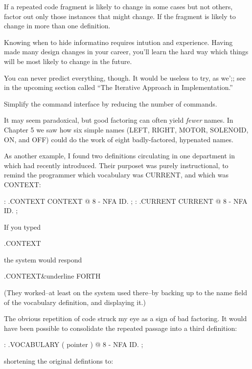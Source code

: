 \begin{tip}
If a repeated code fragment is likely to change in some cases but not others, factor out only those instances that might change. If the fragment is likely to change in more than one definition.
\end{tip}
Knowing when to hide informatino requires intution and experience. Having made many design changes in your career, you'll learn the hard way which things will be most likely to change in the future.

You can never predict everything, though. It would be useless to try, as we';; see in the upcoming section called ``The Iterative Approach in Implementation.''

\begin{tip}
Simplify the command interface by reducing the number of commands.
\end{tip}
It may seem paradoxical, but good factoring can often yield \emph{fewer} names. In Chapter 5 we saw how six simple names (LEFT, RIGHT, MOTOR, SOLENOID, ON, and OFF) could do the work of eight badly-factored, hypenated names.

As another example, I found two definitions circulating in one department in which \Forth{} had recently introduced. Their purposet was purely instructional, to remind the programmer which vocabulary was CURRENT, and which was CONTEXT:

\begin{Code}
: .CONTEXT   CONTEXT @  8 -  NFA  ID. ;
: .CURRENT   CURRENT @  8 -  NFA  ID. ;
\end{Code}
\goodbreak
\noindent If you typed

\begin{Code}
.CONTEXT
\end{Code}
the system would respond


\begin{Code}[commandchars=\&\{\}]
.CONTEXT&underline{ FORTH}
\end{Code}
(They worked--at least on the system used there--by backing up to the name field of the vocabulary definition, and displaying it.)

The obvious repetition of code struck my eye as a sign of bad factoring. It would have been possible to consolidate the repeated passage into a third definition:

\begin{Code}
: .VOCABULARY   ( pointer )  @  8 -  NFA  ID. ;
\end{Code}
shortening the original defintions to:

